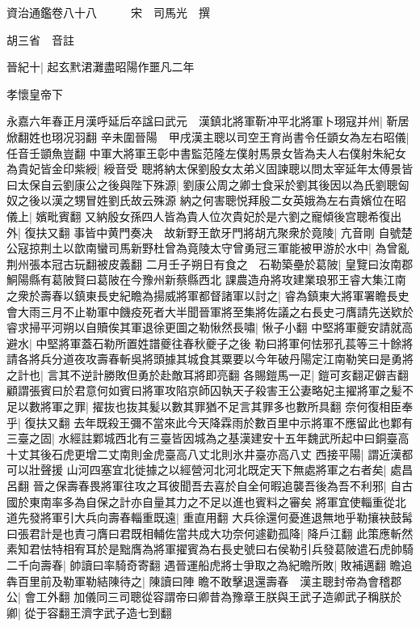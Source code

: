 資治通鑑卷八十八　　　宋　司馬光　撰

胡三省　音註

晉紀十|{
	起玄黓涒灘盡昭陽作噩凡二年}


孝懷皇帝下

永嘉六年春正月漢呼延后卒諡曰武元　漢鎮北將軍靳冲平北將軍卜珝寇并州|{
	靳居焮翻姓也珝况羽翻}
辛未圍晉陽　甲戌漢主聰以司空王育尚書令任顗女為左右昭儀|{
	任音壬顗魚豈翻}
中軍大將軍王彰中書監范隆左僕射馬景女皆為夫人右僕射朱紀女為貴妃皆金印紫綬|{
	綬音受}
聰將納太保劉殷女太弟义固諫聰以問太宰延年太傅景皆曰太保自云劉康公之後與陛下殊源|{
	劉康公周之卿士食采於劉其後因以為氏劉聰匈奴之後以漢之甥冒姓劉氏故云殊源}
納之何害聰悦拜殷二女英娥為左右貴嬪位在昭儀上|{
	嬪毗賓翻}
又納殷女孫四人皆為貴人位次貴妃於是六劉之寵傾後宫聰希復出外|{
	復扶又翻}
事皆中黄門奏决　故新野王歆牙門將胡亢聚衆於竟陵|{
	亢音剛}
自號楚公寇掠荆土以歆南蠻司馬新野杜曾為竟陵太守曾勇冠三軍能被甲游於水中|{
	為曾亂荆州張本冠古玩翻被皮義翻}
二月壬子朔日有食之　石勒築壘於葛陂|{
	皇覽曰汝南郡鮦陽縣有葛陂賢曰葛陂在今豫州新蔡縣西北}
課農造舟將攻建業琅邪王睿大集江南之衆於壽春以鎮東長史紀瞻為揚威將軍都督諸軍以討之|{
	睿為鎮東大將軍署瞻長史}
會大雨三月不止勒軍中饑疫死者大半聞晉軍將至集將佐議之右長史刁膺請先送欵於睿求掃平河朔以自贖俟其軍退徐更圖之勒愀然長嘯|{
	愀子小翻}
中堅將軍夔安請就高避水|{
	中堅將軍蓋石勒所置姓譜夔往春秋夔子之後}
勒曰將軍何怯邪孔萇等三十餘將請各將兵分道夜攻壽春斬吳將頭據其城食其粟要以今年破丹陽定江南勒笑曰是勇將之計也|{
	言其不逆計勝敗但勇於赴敵耳將即亮翻}
各賜鎧馬一疋|{
	鎧可亥翻疋僻吉翻}
顧謂張賓曰於君意何如賓曰將軍攻陷京師囚執天子殺害王公妻略妃主擢將軍之髪不足以數將軍之罪|{
	擢抜也抜其髪以數其罪猶不足言其罪多也數所具翻}
奈何復相臣奉乎|{
	復扶又翻}
去年既殺王彌不當來此今天降霖雨於數百里中示將軍不應留此也鄴有三臺之固|{
	水經註鄴城西北有三臺皆因城為之基漢建安十五年魏武所起中曰銅臺高十丈其後石虎更增二丈南則金虎臺高八丈北則氷井臺亦高八丈}
西接平陽|{
	謂近漢都可以壯聲援}
山河四塞宜北徙據之以經營河北河北既定天下無處將軍之右者矣|{
	處昌呂翻}
晉之保壽春畏將軍往攻之耳彼聞吾去喜於自全何暇追襲吾後為吾不利邪|{
	自古國於東南率多為自保之計亦自量其力之不足以進也賓料之審矣}
將軍宜使輜重從北道先發將軍引大兵向壽春輜重既遠|{
	重直用翻}
大兵徐還何憂進退無地乎勒攘袂鼓髯曰張君計是也責刁膺曰君既相輔佐當共成大功奈何遽勸孤降|{
	降戶江翻}
此策應斬然素知君怯特相宥耳於是黜膺為將軍擢賓為右長史號曰右侯勒引兵發葛陂遣石虎帥騎二千向壽春|{
	帥讀曰率騎奇寄翻}
遇晉運船虎將士爭取之為紀瞻所敗|{
	敗補邁翻}
瞻追犇百里前及勒軍勒結陳待之|{
	陳讀曰陣}
瞻不敢擊退還壽春　漢主聰封帝為會稽郡公|{
	會工外翻}
加儀同三司聰從容謂帝曰卿昔為豫章王朕與王武子造卿武子稱朕於卿|{
	從于容翻王濟字武子造七到翻}
